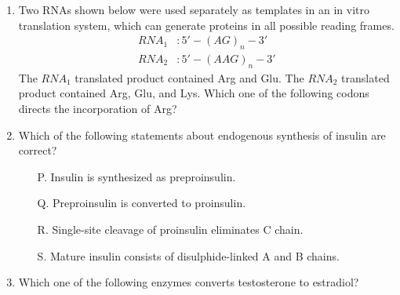 \documentclass[journal,12pt,onecolumn]{IEEEtran}
\theoremstyle{remark}
\begin{document}
\begin{enumerate}
    \item Two RNAs shown below were used separately as templates in an in vitro translation system, which can generate proteins in all possible reading frames.
    \begin{align*}
        RNA_1 &: 5'-(AG)_n-3' \\
        RNA_2 &: 5'-(AAG)_n-3'
    \end{align*}
    The $RNA_1$ translated product contained Arg and Glu.
    The $RNA_2$ translated product contained Arg, Glu, and Lys.
    Which one of the following codons directs the incorporation of Arg?

    \hfill{}
    \begin{enumerate}
    \end{enumerate}

    \item Which of the following statements about endogenous synthesis of insulin are correct?
    \begin{itemize}
        \item[P.] Insulin is synthesized as preproinsulin.
        \item[Q.] Preproinsulin is converted to proinsulin.
        \item[R.] Single-site cleavage of proinsulin eliminates C chain.
        \item[S.] Mature insulin consists of disulphide-linked A and B chains.
    \end{itemize}

    \hfill{}
    \begin{enumerate}
    \end{enumerate}

    \item Which one of the following enzymes converts testosterone to estradiol?


\end{enumerate}
\end{document}
